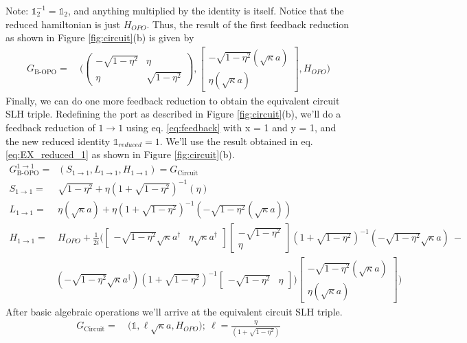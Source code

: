 \documentclass[a4paper]{article}
\begin{document}
Note:  $\mathbb{1}^{-1}_2 = \mathbb{1}_2$, and anything multiplied by the identity is itself. Notice that the reduced hamiltonian is just $H_{OPO}$. Thus, the result of the first feedback reduction as shown in Figure \ref{fig:circuit}(b) is given by 
\begin{align}
    G_{\text{B-OPO}} = & \ \Bigg( \begin{pmatrix} -\sqrt{1-\eta^2} & \eta \\ \eta & \sqrt{1-\eta^2} \end{pmatrix}, \begin{bmatrix}  -\sqrt{1-\eta^2}(\sqrt{\kappa}a) \\ \eta(\sqrt{\kappa}a) \end{bmatrix}, H_{OPO}  \Bigg)
    \label{eq:EX_reduced_1}
\end{align}
Finally, we can do one more feedback reduction to obtain the equivalent circuit SLH triple. Redefining the port as described in Figure \ref{fig:circuit}(b), we'll do a feedback reduction of $1 \rightarrow 1$ using eq. \ref{eq:feedback} with x = 1 and y = 1, and the new reduced identity $\mathbb{1}_{reduced} = 1$. We'll use the result obtained in eq. \ref{eq:EX_reduced_1} as shown in Figure \ref{fig:circuit}(b).
\begin{align*}
    G_{\text{B-OPO}}^{1 \rightarrow 1} = & \ (S_{1 \rightarrow 1}, L_{1 \rightarrow 1}, H_{1 \rightarrow 1}) =  G_{\text{Circuit}} & \\
    S_{1 \rightarrow 1} = & \ \sqrt{1-\eta^2} + \eta (1+\sqrt{1-\eta^2})^{-1}(\eta)& \\
    L_{1 \rightarrow 1} = & \ \eta(\sqrt{\kappa}a) + \eta (1+\sqrt{1-\eta^2})^{-1}(-\sqrt{1-\eta^2}(\sqrt{\kappa}a)) & \\
    H_{1 \rightarrow 1} = & \ H_{OPO} + \frac{1}{2i}\Bigg( \begin{bmatrix} -\sqrt{1-\eta^2}\sqrt{\kappa}a^\dagger  & \eta \sqrt{\kappa}a^\dagger \end{bmatrix} \begin{bmatrix}   -\sqrt{1-\eta^2} \\ \eta \end{bmatrix}  (1+\sqrt{1-\eta^2})^{-1} ( -\sqrt{1-\eta^2}\sqrt{\kappa}a) \ - &  
    \\ &  ( -\sqrt{1-\eta^2}\sqrt{\kappa}a^\dagger) (1+\sqrt{1-\eta^2})^{-1} \begin{bmatrix}  - \sqrt{1-\eta^2} & \eta \end{bmatrix} ) \begin{bmatrix} -\sqrt{1-\eta^2}(\sqrt{\kappa}a) \\ \eta(\sqrt{\kappa}a) \end{bmatrix} \Bigg)& 
\end{align*}
After basic algebraic operations we'll arrive at the equivalent circuit SLH triple. 
\begin{align}
    G_{\text{Circuit}} = & \ \Bigg( \mathbb{1}, \ell \sqrt{\kappa}a ,H_{OPO}\Bigg); \ \ell = \frac{\eta}{(1+\sqrt{1-\eta^2})}
    \label{eq:Ex_Circuit}
\end{align}
\end{document}
